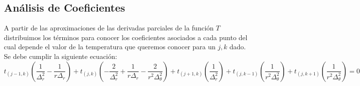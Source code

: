 \newpage
\subsection{Análisis de Coeficientes}
A partir de las aproximaciones de las derivadas parciales de la función $T$ distribuimos los términos para conocer los coeficientes asociados a cada punto del cual depende el valor de la temperatura que queremos conocer para un $j,k$ dado. Se debe cumplir la siguiente ecuación: \\
$$t_{(j-1, k)} (\frac{1}{\Delta^2_r}-\frac{1}{r \Delta_r}) +
t_{(j, k)} (-\frac{2}{\Delta^2_r}+\frac{1}{r \Delta_r}-\frac{2}{r^2 \Delta^2_\theta}) + 
t_{(j+1, k)} (\frac{1}{\Delta^2_r}) + 
t_{(j, k-1)} (\frac{1}{r^2 \Delta^2_\theta}) +
t_{(j, k+1)} (\frac{1}{r^2 \Delta^2_\theta}) = 0 $$ \\

